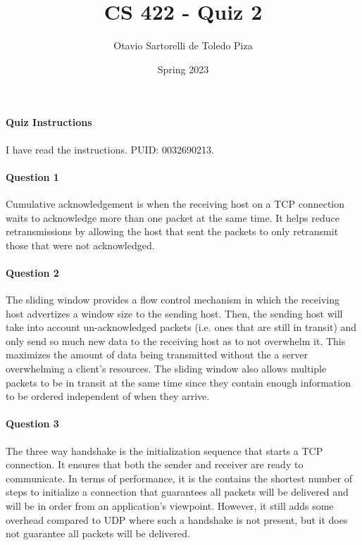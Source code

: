 \documentclass[12pt]{article}
\title{CS 422 - Quiz 2}
\author{Otavio Sartorelli de Toledo Piza}
\date{Spring 2023}
\begin{document}
\maketitle

\pagebreak

\paragraph*{Quiz Instructions}
I have read the instructions. PUID: 0032690213.

\pagebreak

\paragraph*{Question 1}
Cumulative acknowledgement is when the receiving host on a TCP connection waits to acknowledge
more than one packet at the same time. It helps reduce retransmissions by allowing the host that
sent the packets to only retransmit those that were not acknowledged.

\paragraph*{Question 2}
The sliding window provides a flow control mechanism in which the receiving host advertizes a
window size to the sending host. Then, the sending host will take into account un-acknowledged
packets (i.e. ones that are still in transit) and only send so much new data to the receiving
host as to not overwhelm it. This maximizes the amount of data being transmitted without
the a server overwhelming a client's resources. The sliding window also allows multiple packets
to be in transit at the same time since they contain enough information to be ordered independent
of when they arrive.

\paragraph*{Question 3}
The three way handshake is the initialization sequence that starts a TCP connection. It ensures
that both the sender and receiver are ready to communicate. In terms of performance, it is the
contains the shortest number of steps to initialize a connection that guarantees all packets
will be delivered and will be in order from an application's viewpoint. However, it still adds
some overhead compared to UDP where such a handshake is not present, but it does not guarantee
all packets will be delivered.
\end{document}
